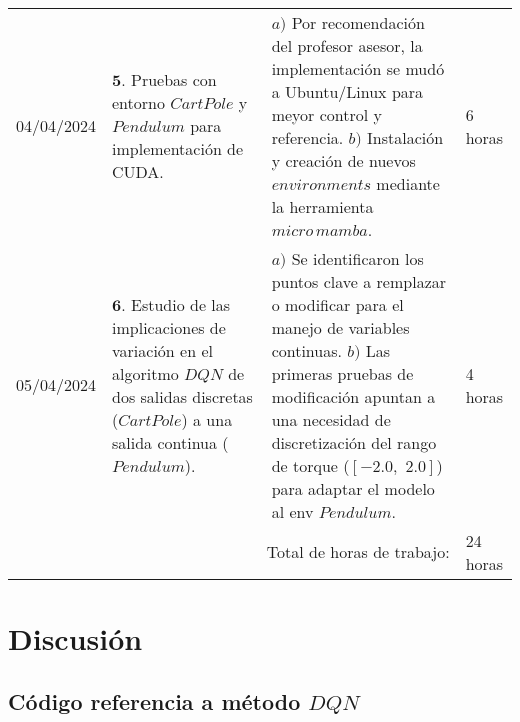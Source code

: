 \documentclass[12pt]{article}
\begin{document}
\hfill\\
\begin{minipage}[h]{\textwidth}
	\centering
	\begin{tabularx}{\textwidth}{|p{2cm}|X|X|p{2cm}|} 
		\hline		
		
	 	04/04/2024 & 
	 	$\mathbf{5}.$ Pruebas con entorno $CartPole$ y $Pendulum$ para implementación de CUDA. &
	 	$a)$ Por recomendación del profesor asesor, la implementación se mudó a Ubuntu/Linux para meyor control y referencia. \newline
	 	$b)$ Instalación y creación de nuevos $environments$ mediante la herramienta $micro\, mamba$. \newline & 
	 	6 horas \\
	 	05/04/2024 & 
	 	$\mathbf{6}.$ Estudio de las implicaciones de variación en el algoritmo $DQN$ \cite{DQNCart} de dos salidas discretas ($CartPole$) a una salida continua ($Pendulum$). &
	 	$a)$ Se identificaron los puntos clave a remplazar o modificar para el manejo de variables continuas. \newline
	 	$b)$ Las primeras pruebas de modificación apuntan a una necesidad de discretización del rango de torque ($[-2.0, \,\, 2.0]$) para adaptar el modelo al env $Pendulum$. \newline & 
	 	4 horas \\
	 	
	 	\hline
		\multicolumn{3}{|r|}{Total de horas de trabajo:} & 24 horas \\ 
	 	\hline                 
	\end{tabularx}
\end{minipage}




\section*{Discusión}

\subsection*{Código referencia a método $DQN$ \cite{DQNCart}}
\end{document}
